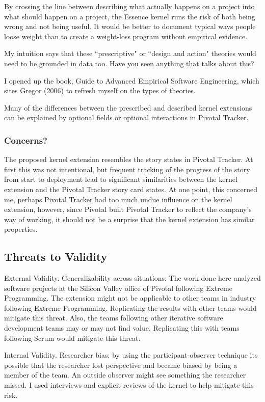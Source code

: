 \documentclass[preprint,12pt,3p]{elsarticle}
\begin{document}
By crossing the line between describing what actually happens on a project into what should happen on a project, the Essence kernel runs the risk of both being wrong and not being useful.  It would be better to document typical ways people loose weight than to create a weight-loss program without empirical evidence. 

My intuition says that these ``prescriptive" or ``design and action" theories would need to be grounded in data too. Have you seen anything that talks about this?

I opened up the book, Guide to Advanced Empirical Software Engineering,  which sites Gregor (2006) to refresh myself on the types of theories.

Many of the differences between the prescribed and described kernel extensions can be explained by optional fields or optional interactions in Pivotal Tracker.

\subsubsection{Concerns?}
The proposed kernel extension resembles the story states in Pivotal Tracker. At first this was not intentional, but frequent tracking of the progress of the story from start to deployment lead to significant similarities between the kernel extension and the Pivotal Tracker story card states. At one point, this concerned me, perhaps Pivotal Tracker had too much undue influence on the kernel extension, however, since Pivotal built Pivotal Tracker to reflect the company's way of working, it should not be a surprise that the kernel extension has similar properties. 

\subsection{Threats to Validity}

External Validity. Generalizability across situations: The work done here analyzed software projects at the Silicon Valley office of Pivotal following Extreme Programming. The extension might not be applicable to other teams in industry following Extreme Programming. Replicating the results with other teams would mitigate this threat. Also, the teams following other iterative software development teams may or may not find value. Replicating this with teams following Scrum would mitigate this threat.

Internal Validity. Researcher bias: by using the participant-observer technique its possible that the researcher lost perspective and became biased by being a member of the team. An outside observer might see something the researcher missed. I used interviews and explicit reviews of the kernel to help mitigate this risk.
\end{document}

